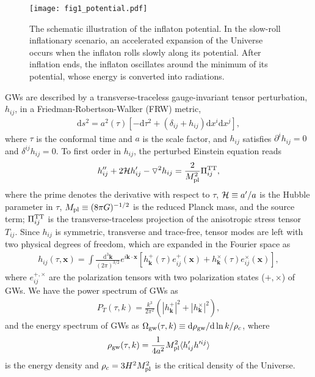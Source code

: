 \documentclass[a4paper,11pt]{article}
\begin{document}
\begin{figure}
  \centering
  \texttt{[image: fig1\_potential.pdf]}
  \caption{The schematic illustration of the inflaton potential. In the slow-roll inflationary scenario, an accelerated expansion of the Universe
  occurs when the inflaton rolls slowly along its potential. After inflation ends, the inflaton oscillates around the minimum of its potential, whose  energy is converted into radiations.}
\label{fig:potential}
\end{figure}


GWs are described by a transverse-traceless gauge-invariant tensor perturbation, $h_{ij}$, in a Friedman-Robertson-Walker (FRW) metric,
\begin{eqnarray}
\mathrm{d}s^2=a^2(\tau)\left[-\mathrm{d}\tau^2+(\delta_{ij}+h_{ij})\mathrm{d}x^i\mathrm{d}x^j\right],
\end{eqnarray}
where $\tau$ is the conformal time and $a$ is the scale factor, and $h_{ij}$ satisfies $\partial^i h_{ij}=0$ and $\delta^{ij}h_{ij}=0$. To first order in $h_{ij}$, the perturbed Einstein equation reads
\begin{eqnarray}
\label{eq:pee}
h_{ij}^{\prime\prime}+2{\cal{H}}h_{ij}^{\prime}-\triangledown^2h_{ij}=\frac{2}{M_{\rm pl}^2}\Pi_{ij}^{\rm TT},
\end{eqnarray}
where the prime denotes the derivative with respect to $\tau$, ${\cal{H}} \equiv a'/a$ is the Hubble parameter in $\tau$, $M_{\rm pl} \equiv (8\pi G)^{-1/2}$ is the reduced Planck mass, and the source term; $\Pi_{ij}^{\rm TT}$ is the transverse-traceless projection of the anisotropic stress tensor $T_{ij}$. Since $h_{ij}$ is symmetric, transverse and trace-free, tensor modes are left with two physical degrees of freedom, which are
expanded in the Fourier space as
\begin{eqnarray}
h_{ij}(\tau,{\mathbf x}) = \int \frac{\mathrm{d}^3{\mathbf k}}{(2\pi)^{3/2}} e^{i{\mathbf k}\cdot{\mathbf x}} \left[h^{+}_{\mathbf k}(\tau)e_{ij}^{+}(\mathbf x)+h^{\times}_{\mathbf k}(\tau)e_{ij}^{\times}(\mathbf x)\right],
\end{eqnarray}
where $e_{ij}^{+,\times}$ are the polarization tensors with two polarization states ($+,\times$) of GWs. We have the power spectrum of GWs as
\begin{eqnarray}
P_T(\tau,k)=\frac{k^3}{2\pi^2}(|h^+_{\mathbf k}|^2+|h^\times_{\mathbf k}|^2),
\end{eqnarray}
and the energy spectrum of GWs as $\Omega_{\rm gw}(\tau,k) \equiv \mathrm{d}\rho_{\rm gw}/\mathrm{d}\ln k/\rho_c$, where
\begin{eqnarray}
\rho_{\rm gw}(\tau,k)=\frac{1}{4a^2}M_{\rm pl}^2 \langle h^{\prime}_{ij}h^{\prime ij}\rangle
\end{eqnarray}
is the energy density and $\rho_c=3H^2M^2_{\rm pl}$ is the critical density of the Universe.
\end{document}
